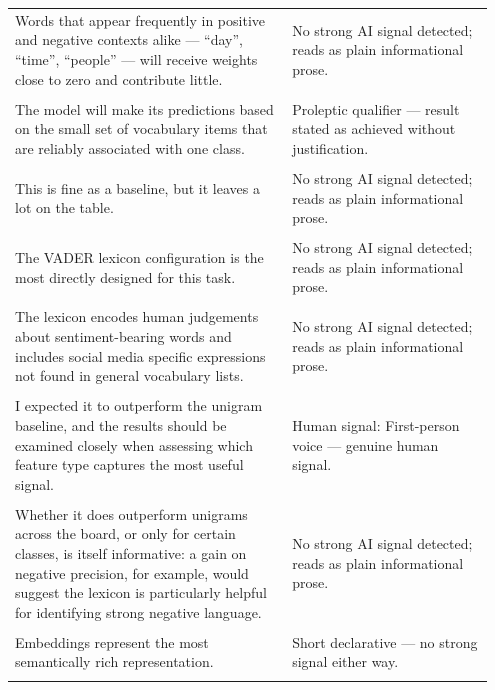 \documentclass[11pt]{article}
\begin{document}
\begin{longtable}{|p{0.55\linewidth}|p{0.40\linewidth}|}
\hline
\rule{0pt}{3.5cm} & \\
\hline
Words that appear frequently in positive and negative contexts alike --- ``day'', ``time'', ``people'' --- will receive weights close to zero and contribute little. & No strong AI signal detected; reads as plain informational prose. \\[2pt]
\hline
\rule{0pt}{3.5cm} & \\
\hline
The model will make its predictions based on the small set of vocabulary items that are reliably associated with one class. & Proleptic qualifier --- result stated as achieved without justification. \\[2pt]
\hline
\rule{0pt}{3.5cm} & \\
\hline
This is fine as a baseline, but it leaves a lot on the table. & No strong AI signal detected; reads as plain informational prose. \\[2pt]
\hline
\rule{0pt}{3.5cm} & \\
\hline
The VADER lexicon configuration is the most directly designed for this task. & No strong AI signal detected; reads as plain informational prose. \\[2pt]
\hline
\rule{0pt}{3.5cm} & \\
\hline
The lexicon encodes human judgements about sentiment-bearing words and includes social media specific expressions not found in general vocabulary lists. & No strong AI signal detected; reads as plain informational prose. \\[2pt]
\hline
\rule{0pt}{3.5cm} & \\
\hline
I expected it to outperform the unigram baseline, and the results should be examined closely when assessing which feature type captures the most useful signal. & Human signal: First-person voice --- genuine human signal. \\[2pt]
\hline
\rule{0pt}{3.5cm} & \\
\hline
Whether it does outperform unigrams across the board, or only for certain classes, is itself informative: a gain on negative precision, for example, would suggest the lexicon is particularly helpful for identifying strong negative language. & No strong AI signal detected; reads as plain informational prose. \\[2pt]
\hline
\rule{0pt}{3.5cm} & \\
\hline
Embeddings represent the most semantically rich representation. & Short declarative --- no strong signal either way. \\[2pt]
\hline
\rule{0pt}{3.5cm} & \\

\end{longtable}
\end{document}
